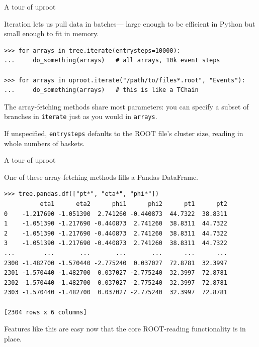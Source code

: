 \documentclass[aspectratio=169]{beamer}
\begin{document}
\begin{frame}[fragile]{A tour of uproot}
\vspace{0.5 cm}
\small

{\normalsize Iteration lets us pull data in batches--- large enough to be efficient in Python but small enough to fit in memory.}

\begin{verbatim}
>>> for arrays in tree.iterate(entrysteps=10000):
...     do_something(arrays)   # all arrays, 10k event steps

>>> for arrays in uproot.iterate("/path/to/files*.root", "Events"):
...     do_something(arrays)   # this is like a TChain
\end{verbatim}

\vspace{0.2 cm}
{\normalsize The array-fetching methods share most parameters: you can specify a subset of branches in {\tt\small iterate} just as you would in {\tt\small arrays}.}

\vspace{0.2 cm}
{\normalsize If unspecified, {\tt\small entrysteps} defaults to the ROOT file's cluster size, reading in whole numbers of baskets.}
\end{frame}

\begin{frame}[fragile]{A tour of uproot}
\vspace{0.5 cm}
\small

{\normalsize One of these array-fetching methods fills a Pandas DataFrame.}

\begin{verbatim}
>>> tree.pandas.df(["pt*", "eta*", "phi*"])
          eta1      eta2      phi1      phi2      pt1      pt2
0    -1.217690 -1.051390  2.741260 -0.440873  44.7322  38.8311
1    -1.051390 -1.217690 -0.440873  2.741260  38.8311  44.7322
2    -1.051390 -1.217690 -0.440873  2.741260  38.8311  44.7322
3    -1.051390 -1.217690 -0.440873  2.741260  38.8311  44.7322
...        ...       ...       ...       ...      ...      ...
2300 -1.482700 -1.570440 -2.775240  0.037027  72.8781  32.3997
2301 -1.570440 -1.482700  0.037027 -2.775240  32.3997  72.8781
2302 -1.570440 -1.482700  0.037027 -2.775240  32.3997  72.8781
2303 -1.570440 -1.482700  0.037027 -2.775240  32.3997  72.8781

[2304 rows x 6 columns]
\end{verbatim}

\vspace{0.2 cm}
{\normalsize Features like this are easy now that the core ROOT-reading functionality is in place.}
\end{frame}
\end{document}
